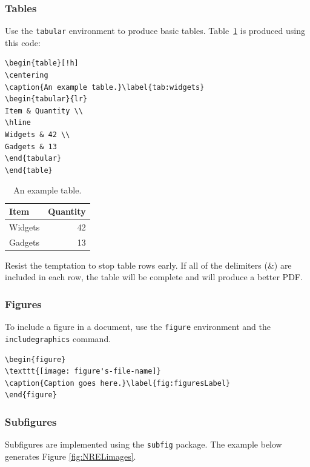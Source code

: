 \subsubsection{Tables}
Use the \texttt{tabular} environment to produce basic tables. Table~\ref{tab:widgets} is produced using this code: 

\begin{lstlisting}
\begin{table}[!h]
\centering
\caption{An example table.}\label{tab:widgets}
\begin{tabular}{lr}
Item & Quantity \\
\hline
Widgets & 42 \\
Gadgets & 13
\end{tabular}
\end{table}
\end{lstlisting}

\begin{table}[!h]
\centering
\caption{An example table.}\label{tab:widgets}
\begin{tabular}{lr}
Item & Quantity \\
\hline
Widgets & 42 \\
Gadgets & 13
\end{tabular}
\end{table}

Resist the temptation to stop table rows early. If all of the delimiters (\&) are included in each row, the table will be complete and will produce a better PDF.

\subsubsection{Figures}
To include a figure in a document, use the \texttt{figure} environment and the \texttt{includegraphics} command.

\begin{lstlisting}
\begin{figure}
\texttt{[image: figure's-file-name]}
\caption{Caption goes here.}\label{fig:figuresLabel}
\end{figure}
\end{lstlisting}

\subsubsection{Subfigures}

Subfigures are implemented using the \texttt{subfig} package. The example below generates Figure \ref{fig:NRELimages}.


